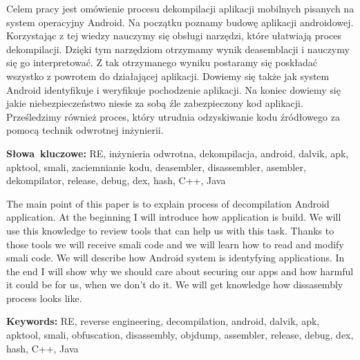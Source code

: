 \documentclass[12pt,a4paper,leqno,oneside,titlepage]{book}
\newenvironment{abstractpage}
  {\cleardoublepage\vspace*{\fill}\thispagestyle{empty}}
  {\vfill\cleardoublepage}
\newenvironment{abstract}[1]
  {\bigskip\selectlanguage{#1}%
   \begin{center}\bfseries\abstractname\end{center}}
  {\par\bigskip}
\begin{document}
\begin{abstractpage}
\begin{abstract}{polish}
Celem pracy jest omówienie procesu dekompilacji aplikacji mobilnych pisanych na system operacyjny Android.
Na początku poznamy budowę aplikacji androidowej. Korzystając z tej wiedzy nauczymy się obsługi narzędzi, które ułatwiają proces dekompilacji. Dzięki tym narzędziom otrzymamy wynik deasemblacji i nauczymy się go interpretować. Z tak otrzymanego wyniku postaramy się poskładać wszystko z powrotem do działającej aplikacji. Dowiemy się także jak system Android identyfikuje i weryfikuje pochodzenie aplikacji. Na koniec dowiemy się jakie niebezpieczeństwo niesie za sobą źle zabezpieczony kod aplikacji. Prześledzimy również proces, który utrudnia odzyskiwanie kodu źródłowego za pomocą technik odwrotnej inżynierii.
 
\end{abstract}
\smallskip
\noindent \textbf{Słowa~kluczowe:} RE, inżynieria odwrotna, dekompilacja, android, dalvik, apk, apktool, smali, zaciemnianie kodu, deasembler, disassembler, asembler, dekompilator, release, debug, dex, hash, C++, Java

\begin{abstract}{english}
The main point of this paper is to explain process of decompilation Android application. At the beginning I will introduce how application is build. We will use this knowledge  to review tools that can help us with this task. Thanks to those tools we will receive smali code and we will learn how to read and modify smali code. We will describe how Android system is identyfying applications. In the end I will show why we should care about securing our apps and how harmful it could be for us, when we don't do it. We will get knowledge how dissasembly process looks like.
\end{abstract}
\smallskip
\noindent \textbf{Keywords:} RE, reverse engineering, decompilation, android, dalvik, apk, apktool, smali, obfuscation, disassembly, objdump, assembler, release, debug, dex, hash, C++, Java
\end{abstractpage}

\mainmatter

\end{document}
